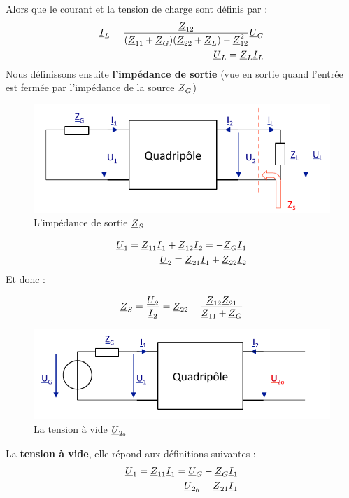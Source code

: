 \documentclass[12pt,a4paper]{article}
\newcommand{\uz}{\uline{Z} }
\newcommand{\ui}{\uline{I} }
\newcommand{\uu}{\uline{U} }
\begin{document}
Alors que le courant et la tension de charge sont définis par :
\begin{align}
	\ui_L = \frac{\uz_{12}}{(\uz_{11} + \uz_G)(\uz_{22}+\uz_L) - \uz_{12}^2} \uu_G\\
	\uu_L = \uz_L\ui_L
\end{align}
Nous définissons ensuite \textbf{l'impédance de sortie} (vue en sortie quand l'entrée est fermée par l'impédance de la source $\uz_G$)
\begin{figure}[!h]
	\centering
	\includegraphics[scale=0.65]{images/quadripole_circuit_3}
	\caption{L'impédance de sortie $\uz_S$}
\end{figure}
\begin{align*}
	\uu_1 = \uz_{11}\ui_1 + \uz_{12}\ui_2 = -\uz_G\ui_1\\
	\uu_2 = \uz_{21}\ui_1 + \uz_{22}\ui_2
\end{align*}
Et donc :
\begin{boite}[0.6]
	\begin{equation}
		\uz_S = \frac{\uu_2}{\ui_2} = \uz_{22}-\frac{\uz_{12}\uz_{21}}{\uz_{11} + \uz_G}
		\label{equ: quadrip 2}
	\end{equation}
\end{boite}
\begin{figure}[!h]
	\centering
	\includegraphics[scale=0.65]{images/quadripole_circuit_4}
	\caption{La tension à vide $\uu_{2_0}$}
\end{figure}
La \textbf{tension à vide}, elle répond aux définitions suivantes :
\begin{align*}
\uu_1 = \uz_{11}\ui_1 = \uu_G-\uz_G\ui_1\\
\uu_{2_0} = \uz_{21}\ui_1
\end{align*}
\end{document}
